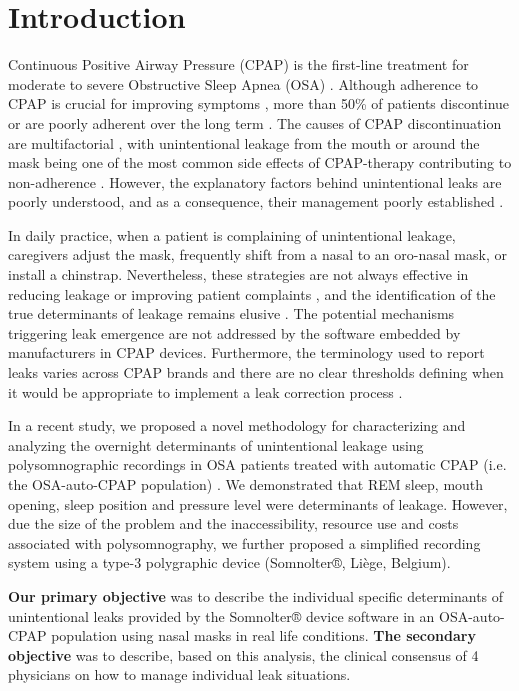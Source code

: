 \section{Introduction}
\textbf{}
\hspace{\par}
Continuous Positive Airway Pressure (CPAP) is the first-line treatment for moderate to severe Obstructive Sleep Apnea (OSA) \citep{levy, patil}. Although adherence to CPAP is crucial for improving symptoms \citep{weaver2007}, more than 50\% of patients discontinue or are poorly adherent over the long term \citep{weaver2008, mcevoy}. The causes of CPAP discontinuation are multifactorial \citep{gagnadoux, borel}, with unintentional leakage from the mouth or around the mask being one of the most common side effects of CPAP-therapy contributing to non-adherence \citep{bachour2004, valentin}. However, the explanatory factors behind unintentional leaks are poorly understood, and as a consequence, their management poorly established \citep{lebret2017}.

In daily practice, when a patient is complaining of unintentional leakage, caregivers adjust the mask, frequently shift from a nasal to an oro-nasal mask, or install a chinstrap. Nevertheless, these strategies are not always effective in reducing leakage or improving patient complaints \citep{bachour2015}, and the identification of the true determinants of leakage remains elusive \citep{lebret2018}. The potential mechanisms triggering leak emergence are not addressed by the software embedded by manufacturers in CPAP devices. Furthermore, the terminology used to report leaks varies across CPAP brands and there are no clear thresholds defining when it would be appropriate to implement a leak correction process \citep{schwab}.

In a recent study, we proposed a novel methodology for characterizing and analyzing the overnight determinants of unintentional leakage using polysomnographic recordings in OSA patients treated with automatic CPAP (i.e. the OSA-auto-CPAP population) \citep{lebret2018}. We demonstrated that REM sleep, mouth opening, sleep position and pressure level were determinants of leakage. However, due the size of the problem and the inaccessibility, resource use and costs associated with polysomnography, we further proposed a simplified recording system using a type-3 polygraphic device (Somnolter®, Liège, Belgium). 

\textbf{Our primary objective} was to describe the individual specific determinants of unintentional leaks provided by the Somnolter® device software in an OSA-auto-CPAP population using nasal masks in real life conditions. \textbf{The secondary objective} was to describe, based on this analysis, the clinical consensus of 4 physicians on how to manage individual leak situations.


